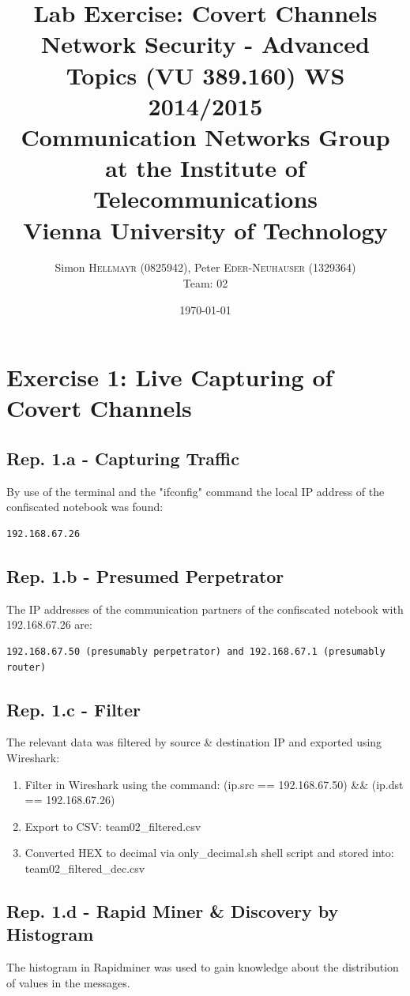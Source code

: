 \documentclass{article}
\title{\textbf{Lab Exercise: Covert Channels} \\
Network Security - Advanced Topics (VU 389.160) WS 2014/2015 \\
Communication Networks Group at the Institute of Telecommunications \\
Vienna University of Technology } %
\author{Simon \textsc{Hellmayr (0825942)}, Peter \textsc{Eder-Neuhauser (1329364)} \\[0.7cm] \LARGE Team: 02} %
\date{\today} %
\begin{document}
\maketitle %


\renewcommand{\arraystretch}{2} %
\section*{Exercise 1: Live Capturing of Covert Channels}

\subsection*{Rep. 1.a - Capturing Traffic}
By use of the terminal and the "ifconfig" command the local IP address of the confiscated notebook was found:
\begin{verbatim}
192.168.67.26
\end{verbatim}

\subsection*{Rep. 1.b - Presumed Perpetrator}
The IP addresses of the communication partners of the confiscated notebook with 192.168.67.26 are:
\begin{verbatim}
192.168.67.50 (presumably perpetrator) and 192.168.67.1 (presumably router)
\end{verbatim}

\subsection*{Rep. 1.c - Filter}
The relevant data was filtered by source \& destination IP and exported using Wireshark:
\begin{enumerate}
	\item Filter in Wireshark using the command: (ip.src == 192.168.67.50) \&\& (ip.dst == 192.168.67.26)
	\item Export to CSV: team02\_filtered.csv
	\item Converted HEX to decimal via only\_decimal.sh shell script and stored into: team02\_filtered\_dec.csv
\end{enumerate} 

\subsection*{Rep. 1.d - Rapid Miner \& Discovery by Histogram}
The histogram in Rapidminer was used to gain knowledge about the distribution of values in the messages.
\end{document}
